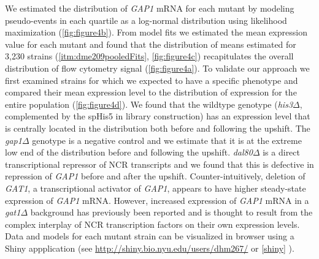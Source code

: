 We estimated the distribution of \textit{GAP1} mRNA for each mutant by
modeling pseudo-events in each quartile as a
log-normal distribution using likelihood maximization  
(\autoref{fig:figure4b}). 
From model fits we estimated the mean expression value for each
mutant and found that the distribution of means estimated for
3,230 strains (\autoref{itm:dme209pooledFits}, \autoref{fig:figure4c}) 
recapitulates the overall
distribution of flow cytometry signal (\autoref{fig:figure4a}). 
To validate our approach we first examined
strains for which we expected to have a specific phenotype and
compared their mean expression level to the distribution of expression
for the entire population (\autoref{fig:figure4d}). We found that the wildtype
genotype (\textit{his3}$\Delta$, complemented by the spHis5 in
library construction) has an expression level that is centrally
located in the distribution both before and following the upshift. The
\textit{gap1}$\Delta$ genotype is a negative control and 
we estimate that it is at the extreme
low end of the distribution before and following the upshift. 
\textit{dal80}$\Delta$ is a direct transcriptional repressor
of NCR transcripts %
and we found that this is defective in
repression of \textit{GAP1} before and after the upshift. 
Counter-intuitively, deletion of \textit{GAT1}, a transcriptional activator
of \textit{GAP1}, appears to have higher steady-state expression of
\textit{GAP1} mRNA.
However, increased expression of \textit{GAP1} mRNA in a
\textit{gat1}$\Delta$ background has
previously been reported \parencite{scherens2006identification} and is thought to
result from the complex interplay of NCR transcription factors on
their own expression levels. 
Data and models for each mutant strain can be visualized in browser
using a Shiny appplication (see
\url{http://shiny.bio.nyu.edu/users/dhm267/} or \autoref{shiny} ). 

